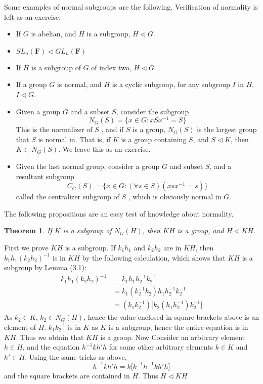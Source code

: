 \documentclass[12pt]{amsbook}
\makeatletter
\theoremstyle{plain}
\newtheorem{theorem}{Theorem}[chapter]
\theoremstyle{definition}
\renewenvironment{proof}[1][\proofname]{\par
  \pushQED{\qed}%
  \normalfont \topsep6\p@\@plus6\p@\relax
  \list{}{\leftmargin=0em
          \rightmargin=\leftmargin
          \settowidth{\itemindent}{\itshape#1}%
          \labelwidth=\itemindent}

  \item[\hskip\labelsep
        \itshape
    #1\@addpunct{.}]\ignorespaces
}{%
  \popQED\endlist\@endpefalse
}
\makeatother
\begin{document}
Some examples of normal subgroups are the following. Verification of normality is left as an exercise:
\begin{itemize}
    \item If $G$ is abelian, and $H$ is a subgroup, $H \lhd G$.
    \item $SL_n(\mathbf{F}) \lhd GL_n(\mathbf{F})$
    \item If $H$ is a subgroup of $G$ of index two, $H \lhd G$
    \item If a group $G$ is normal, and $H$ is a cyclic subgroup, for any subgroup $I$ in $H$, $I \lhd G$.
    \item Given a group $G$ and a subset $S$, consider the subgroup
    \[ N_G(S) = \{ x \in G : xSx^{-1} = S \} \]
    This is the normalizer of $S$ , and if $S$ is a group, $N_G(S)$ is the largest group that $S$ is normal in. That is, if $K$ is a group containing $S$, and $S \lhd K$, then $K \subset N_G(S)$. We leave this as an exercise.
    \item Given the last normal group, consider a group $G$ and subset $S$, and a resultant subgroup
    \[ C_G(S) = \{ x \in G : (\forall s \in S)(xsx^{-1} = s) \} \]
    called the centralizer subgroup of $S$ , which is obviously normal in $G$.
\end{itemize}

The following propositions are an easy test of knowledge about normality.

\begin{theorem}
    If $K$ is a subgroup of $N_G(H)$, then $KH$ is a group, and $H \lhd KH$.
\end{theorem}
\begin{proof}
    First we prove $KH$ is a subgroup. If $k_1h_1$ and $k_2h_2$ are in $KH$, then $k_1h_1(k_2h_2)^{-1}$ is in $KH$ by the following calculation, which shows that $KH$ is a subgroup by Lemma (3.1):
    \begin{align*}
    k_1h_1(k_2h_2)^{-1} &= k_1h_1h_2^{-1}k_2^{-1}\\
                        &= k_1(k_2^{-1}k_2)h_1h_2^{-1}k_2^{-1}\\
                        &= (k_1k_2^{-1})\big[ k_2(h_1h_2^{-1})k_2^{-1} \big]
    \end{align*}
    As $k_2 \in K$, $k_2 \in N_G(H)$, hence the value enclosed in square brackets above is an element of $H$. $k_1k_2^{-1}$ is in $K$ as $K$ is a subgroup, hence the entire equation is in $KH$. Thus we obtain that $KH$ is a group. Now Consider an arbitrary element $h \in H$, and the equation $h^{-1}kh'h$ for some other arbitrary elements $k \in K$ and $h' \in H$. Using the same tricks as above,
    \[ h^{-1}kh'h = k \big[ k^{-1}h^{-1}kh'h \big] \]
    and the square brackets are contained in $H$. Thus $H \lhd KH$
\end{proof}
\end{document}
